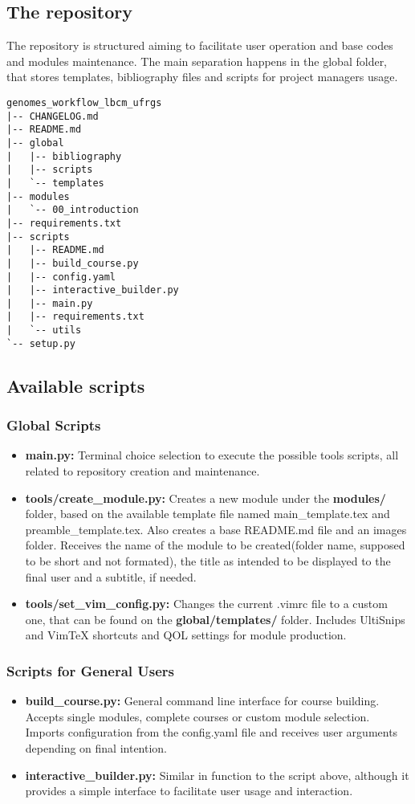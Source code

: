 \documentclass[a4paper,11pt]{article}
\begin{document}
\subsection{The repository}
The repository is structured aiming to facilitate user operation and base codes
and modules maintenance. The main separation happens in the global folder, that
stores templates, bibliography files and scripts for project managers usage.
\begin{verbatim}
genomes_workflow_lbcm_ufrgs
|-- CHANGELOG.md
|-- README.md
|-- global
|   |-- bibliography
|   |-- scripts
|   `-- templates
|-- modules
|   `-- 00_introduction
|-- requirements.txt
|-- scripts
|   |-- README.md
|   |-- build_course.py
|   |-- config.yaml
|   |-- interactive_builder.py
|   |-- main.py
|   |-- requirements.txt
|   `-- utils
`-- setup.py
\end{verbatim}

\subsection{Available scripts}
\subsubsection{Global Scripts}
\begin{itemize}
    \item \textbf{main.py:} Terminal choice selection to execute the possible
        tools scripts, all related to repository creation and maintenance.
    \item \textbf{tools/create\_module.py:} Creates a new module under the
        \textbf{modules/} folder, based on the available template file named
        main\_template.tex and preamble\_template.tex. Also creates a base
        README.md file and an images folder. Receives the name of the module to
        be created(folder name, supposed to be short and not formated), the
        title as intended to be displayed to the final user and a subtitle, if
        needed. 
    \item \textbf{tools/set\_vim\_config.py:} Changes the current .vimrc file to
        a custom one, that can be found on the \textbf{global/templates/}
        folder. Includes UltiSnips and VimTeX shortcuts and QOL settings for
        module production.
\end{itemize}
\subsubsection{Scripts for General Users}
\begin{itemize}
    \item \textbf{build\_course.py:} General command line interface for course
        building. Accepts single modules, complete courses or custom module
        selection. Imports configuration from the config.yaml file and receives
        user arguments depending on final intention.
    \item \textbf{interactive\_builder.py:} Similar in function to the script
        above, although it provides a simple interface to facilitate user usage
        and interaction.
\end{itemize}
\end{document}
